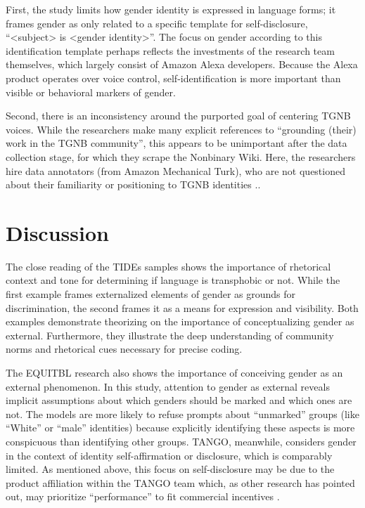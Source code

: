 \documentclass[11pt]{article}
\begin{document}
First, the study limits how gender identity is expressed in language forms; it frames gender as only related to a specific template for self-disclosure, “<subject> is <gender identity>”. The focus on gender according to this identification template perhaps reflects the investments of the research team themselves, which largely consist of Amazon Alexa developers. Because the Alexa product operates over voice control, self-identification is more important than visible or behavioral markers of gender.

Second, there is an inconsistency around the purported goal of centering TGNB voices. While the researchers make many explicit references to “grounding (their) work in the TGNB community”, this appears to be unimportant after the data collection stage, for which they scrape the Nonbinary Wiki. Here, the researchers hire data annotators (from Amazon Mechanical Turk), who are not questioned about their familiarity or positioning to TGNB identities \citep{ovalle:2023}..

\section{Discussion}
The close reading of the TIDEs samples shows the importance of rhetorical context and tone for determining if language is transphobic or not. While the first example frames externalized elements of gender as grounds for discrimination, the second frames it as a means for expression and visibility. Both examples demonstrate \citet{amin:2022} theorizing on the importance of conceptualizing gender as external. Furthermore, they illustrate the deep understanding of community norms and rhetorical cues necessary for precise coding. 

The EQUITBL research also shows the importance of conceiving gender as an external phenomenon. In this study, attention to gender as external reveals implicit assumptions about which genders should be marked and which ones are not. The models are more likely to refuse prompts about “unmarked” groups (like “White” or “male” identities) because explicitly identifying these aspects is more conspicuous than identifying other groups. TANGO, meanwhile, considers gender in the context of identity self-affirmation or disclosure, which is comparably limited. As mentioned above, this focus on self-disclosure may be due to the product affiliation within the TANGO team which, as other research has pointed out, may prioritize “performance” to fit commercial incentives \citep{birhane:2022}. 
\end{document}
